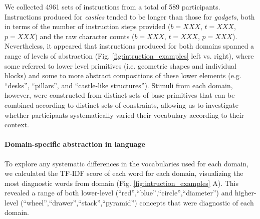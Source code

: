 \documentclass[10pt,letterpaper]{article}
\begin{document}
We collected 4961 sets of instructions from a total of 589 participants. %
Instructions produced for \textit{castles} tended to be longer than those for \textit{gadgets}, both in terms of the number of instruction steps provided ($b=XXX$, $t=XXX$, $p=XXX$) and the raw character counts ($b=XXX$, $t=XXX$, $p=XXX$).
Nevertheless, it appeared that instructions produced for both domains spanned a range of levels of abstraction (Fig. \ref{fig:intruction_examples} left vs. right), where some referred to lower level primitives (i.e. geometric shapes and individual blocks) and some to more abstract compositions of these lower elements (e.g. ``desks'', ``pillars'', and ``castle-like structures'').
Stimuli from each domain, however, were constructed from distinct sets of base primitives that can be combined according to distinct sets of constraints, allowing us to investigate whether participants systematically varied their vocabulary according to their context.

\paragraph{Domain-specific abstraction in language}
To explore any systematic differences in the vocabularies used for each domain, we calculated the TF-IDF score of each word for each domain, visualizing the most diagnostic words from domain (Fig. \ref{fig:intruction_examples} A). %
This revealed a range of both lower-level (``red'',``blue'',``circle'',``diameter'') and higher-level (``wheel'',``drawer'',``stack'',``pyramid'') concepts that were diagnostic of each domain.
\end{document}
